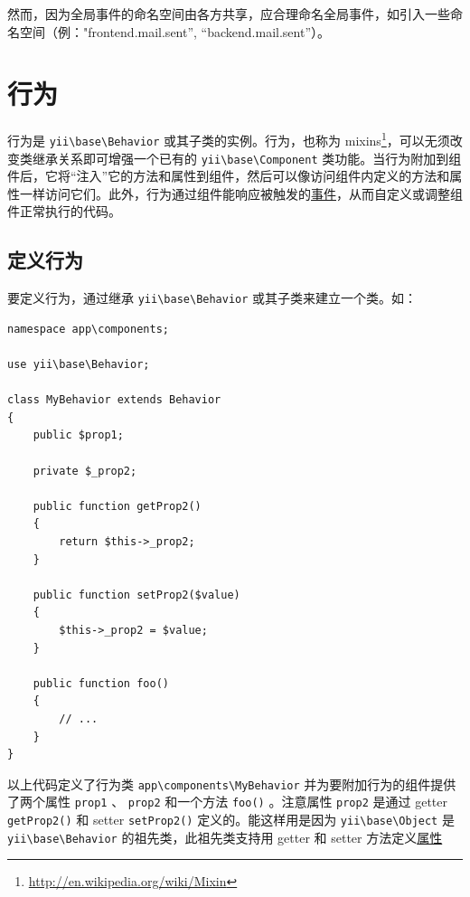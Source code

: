 然而，因为全局事件的命名空间由各方共享，应合理命名全局事件，如引入一些命名空间（例："frontend.mail.sent'', ``backend.mail.sent''）。



\label{concept-behaviors.md}\section{行为}
行为是 \texttt{yii{\allowbreak{}\textbackslash}base{\allowbreak{}\textbackslash}Behavior} 或其子类的实例。行为，也称为 mixins\footnote{\url{http://en.wikipedia.org/wiki/Mixin}}，可以无须改变类继承关系即可增强一个已有的 \texttt{yii{\allowbreak{}\textbackslash}base{\allowbreak{}\textbackslash}Component} 类功能。当行为附加到组件后，它将“注入”它的方法和属性到组件，然后可以像访问组件内定义的方法和属性一样访问它们。此外，行为通过组件能响应被触发的\hyperref[basic-events.md]{事件}，从而自定义或调整组件正常执行的代码。

\subsection{定义行为}
要定义行为，通过继承 \texttt{yii{\allowbreak{}\textbackslash}base{\allowbreak{}\textbackslash}Behavior} 或其子类来建立一个类。如：

\lstset{language=php}\begin{lstlisting}
namespace app\components;

use yii\base\Behavior;

class MyBehavior extends Behavior
{
    public $prop1;

    private $_prop2;

    public function getProp2()
    {
        return $this->_prop2;
    }

    public function setProp2($value)
    {
        $this->_prop2 = $value;
    }

    public function foo()
    {
        // ...
    }
}
\end{lstlisting}
以上代码定义了行为类 \lstinline|app\components\MyBehavior| 并为要附加行为的组件提供了两个属性 \lstinline|prop1| 、 \lstinline|prop2| 和一个方法 \lstinline|foo()| 。注意属性 \lstinline|prop2| 是通过 getter \lstinline|getProp2()| 和 setter \lstinline|setProp2()| 定义的。能这样用是因为 \texttt{yii{\allowbreak{}\textbackslash}base{\allowbreak{}\textbackslash}Object} 是 \texttt{yii{\allowbreak{}\textbackslash}base{\allowbreak{}\textbackslash}Behavior} 的祖先类，此祖先类支持用 getter 和 setter 方法定义\hyperref[basic-properties.md]{属性}

